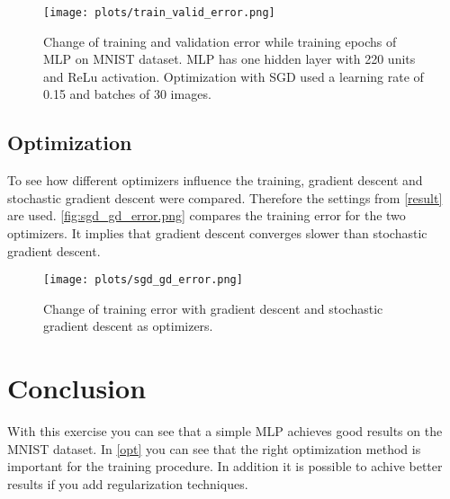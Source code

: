 \documentclass[a4paper,12pt]{article}
\begin{document}
\begin{figure}[H]
  \centering \texttt{[image: plots/train\_valid\_error.png]}
  \caption{
    \label{fig:train_valid_error}
    Change of training and validation error while training epochs of MLP on MNIST dataset. MLP has one hidden layer with 220 units and ReLu activation. Optimization with SGD used a learning rate of 0.15 and batches of 30 images.
  }
\end{figure}

\subsection{Optimization}\label{opt}
To see how different optimizers influence the training, gradient descent and stochastic gradient descent were compared. Therefore the settings from \autoref{result} are used. \autoref{fig:sgd_gd_error.png} compares the training error for the two optimizers. It implies that gradient descent converges slower than stochastic gradient descent.


\begin{figure}[H]
	\centering \texttt{[image: plots/sgd\_gd\_error.png]}
	\caption{
		\label{fig:sgd_gd_error.png}
		Change of training error with gradient descent and stochastic gradient descent as optimizers.
	}
\end{figure}

\section{Conclusion}
With this exercise you can see that a simple MLP achieves good results on the MNIST dataset. In \autoref{opt} you can see that the right optimization method is important for the training procedure. In addition it is possible to achive better results if you add regularization techniques.
\end{document}
